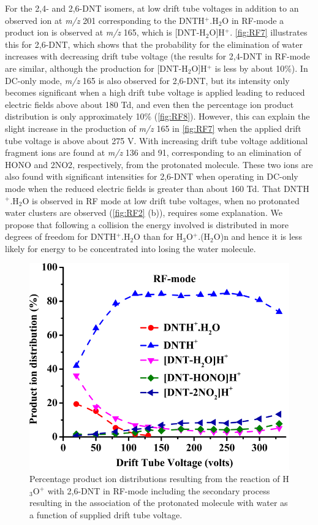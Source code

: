 For the 2,4- and 2,6-DNT isomers, at low drift tube voltages in addition to an observed ion at \textit{m/z} 201 corresponding to the DNTH$^+$.H$_2$O in RF-mode a product ion is observed at \textit{m/z} 165, which is [DNT-H$_2$O]H$^+$. \autoref{fig:RF7} illustrates this for 2,6-DNT, which shows that the probability for the elimination of water increases with decreasing drift tube voltage (the results for 2,4-DNT in RF-mode are similar, although the production for [DNT-H$_2$O]H$^+$ is less by about 10\%). In DC-only mode, \textit{m/z} 165 is also observed for 2,6-DNT, but its intensity only becomes significant when a high drift tube voltage is applied leading to reduced electric fields above about 180 Td, and even then the percentage ion product distribution is only approximately 10\% (\autoref{fig:RF8}). However, this can explain the slight increase in the production of \textit{m/z} 165 in \autoref{fig:RF7} when the applied drift tube voltage is above about 275 V. With increasing drift tube voltage additional fragment ions are found at \textit{m/z} 136 and 91, corresponding to an elimination of HONO and 2NO2, respectively, from the protonated molecule. These two ions are also found with significant intensities for 2,6-DNT when operating in DC-only mode when the reduced electric fields is greater than about 160 Td. That DNTH$^+$.H$_2$O is observed in RF mode at low drift tube voltages, when no protonated water clusters are observed (\autoref{fig:RF2} (b)), requires some explanation. We propose that following a collision the energy involved is distributed in more degrees of freedom for DNTH$^+$.H$_2$O than for H$_3$O$^+$.(H$_2$O)n and hence it is less likely for energy to be concentrated into losing the water molecule.

\begin{figure}%
\centering
\includegraphics[height=0.3\textheight]{pics/RFpaper_fig7.png}
\caption{Percentage product ion distributions resulting from the reaction of H$_3$O$^+$ with 2,6-DNT in RF-mode including the secondary process resulting in the association of the protonated molecule with water as a function of supplied drift tube voltage.}
\label{fig:RF7}
\end{figure}

